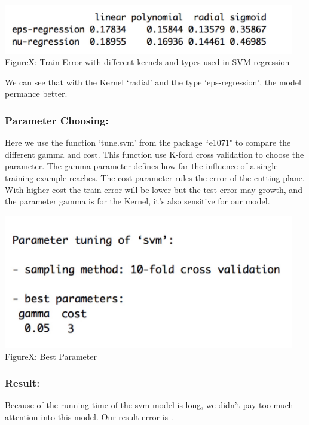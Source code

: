 \documentclass[a4paper]{article}
\begin{document}
	\begin{center}
	\includegraphics[width=5in]{svmkernal.png}\\
	FigureX: Train Error with different kernels and types used in SVM regression
	\end{center}

	We can see that with the Kernel `radial' and the type `eps-regression', the model permance better.

	\subsubsection{Parameter Choosing:}

	Here we use the function `tune.svm' from the package ``e1071" to compare the different gamma and cost. This function use K-ford cross validation to choose the parameter. The gamma parameter defines how far the influence of a single training example reaches. The cost parameter rules the error of the cutting plane. With higher cost the train error will be lower but the test error may growth, and the parameter gamma is for the Kernel, it's also sensitive for our model.

	\begin{center}
	\includegraphics[width=5in]{svmp.jpeg}\\
	FigureX: Best Parameter
	\end{center}

	\subsubsection{Result:}

	Because of the running time of the svm model is long, we didn't pay too much attention into this model. Our result error is .
\end{document}
